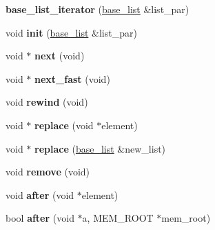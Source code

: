 \begin{DoxyCompactItemize}
\item 
\mbox{\label{classbase__list__iterator_a8854445e898a4b0023892c4c82ee41aa}} 
{\bfseries base\+\_\+list\+\_\+iterator} (\mbox{\hyperlink{classbase__list}{base\+\_\+list}} \&list\+\_\+par)
\item 
\mbox{\label{classbase__list__iterator_a10f0297a93d9e467e9dfb0e7ff3f389a}} 
void {\bfseries init} (\mbox{\hyperlink{classbase__list}{base\+\_\+list}} \&list\+\_\+par)
\item 
\mbox{\label{classbase__list__iterator_a98189ee766ec817d1cdd245fa3de005c}} 
void $\ast$ {\bfseries next} (void)
\item 
\mbox{\label{classbase__list__iterator_a457e8c0331282663cc09a0eb01d93e3e}} 
void $\ast$ {\bfseries next\+\_\+fast} (void)
\item 
\mbox{\label{classbase__list__iterator_a9b8797e193a0729f888a4cf6a4b585a8}} 
void {\bfseries rewind} (void)
\item 
\mbox{\label{classbase__list__iterator_aa695d6755ac9bfcb40c79200a9a51306}} 
void $\ast$ {\bfseries replace} (void $\ast$element)
\item 
\mbox{\label{classbase__list__iterator_a7d8e39d4e977f41d251711b419d4d9f1}} 
void $\ast$ {\bfseries replace} (\mbox{\hyperlink{classbase__list}{base\+\_\+list}} \&new\+\_\+list)
\item 
\mbox{\label{classbase__list__iterator_ad52933fda61298ff3e2e174428a8275f}} 
void {\bfseries remove} (void)
\item 
\mbox{\label{classbase__list__iterator_a3ffe3c7d051f66b47221d6ec9f08a50d}} 
void {\bfseries after} (void $\ast$element)
\item 
\mbox{\label{classbase__list__iterator_af2523d1b7445c2139e273467affbd610}} 
bool {\bfseries after} (void $\ast$a, M\+E\+M\+\_\+\+R\+O\+OT $\ast$mem\+\_\+root)

\end{DoxyCompactItemize}
